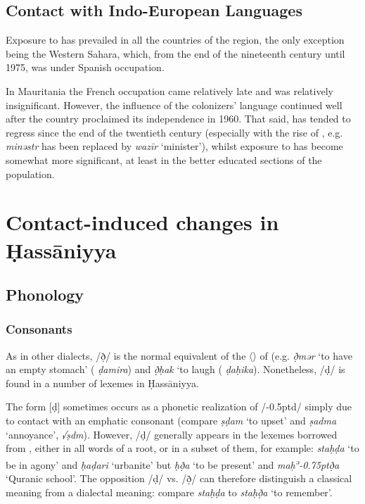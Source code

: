 \documentclass[output=paper]{langsci/langscibook}
\begin{document}
\subsection{Contact with Indo-European Languages} %

Exposure to  has prevailed in all the countries of the region, the only exception being the {Western} Sahara, which, from the end of the nineteenth century until 1975, was under Spanish occupation.

In Mauritania the French occupation came relatively late and was relatively insignificant. However, the influence of the colonizers’ language continued well after the country proclaimed its independence in 1960. That said,  has tended to regress since the end of the twentieth century (especially with the rise of  , e.g. \textit{minəstr} has been replaced by \textit{wazīr} ‘minister’), whilst exposure to  has become somewhat more significant, at least in the better educated sections of the population.

\section{Contact-induced changes in Ḥassāniyya} %

\subsection{Phonology} %

\subsubsection{Consonants} %
As in other  dialects, /ð̣/ is the normal equivalent of the 〈〉 of   (e.g. \textit{ð̣mər} ‘to have an empty stomach’ ( \textit{ḍamira}) and \textit{ð̣ḥak} ‘to laugh ( \textit{ḍaḥika}). Nonetheless, /ḍ/ is found in a number of lexemes in Ḥassāniyya. 

The form [ḍ] sometimes occurs as a phonetic realization of /\kern -0.5ptd/ simply due to contact with an {emphatic consonant} (compare \textit{ṣḍam} ‘to upset’ and \textit{ṣadma} ‘annoyance’,  \textit{√ṣdm}). However, /ḍ/ generally appears in the lexemes borrowed from  , either in all words of a {root}, or in a subset of them, for example: \textit{staḥḍa{\R}} ‘to be in agony’ and \textit{ḥaḍari} ‘urbanite’ but \textit{ḥð̣a{\R}} ‘to be present’ and \textit{maḥ\textsuperscript{ə}\kern -0.75ptð̣{\R}a} ‘Quranic school’. The opposition /ḍ/ vs. /ð̣/ can therefore distinguish a classical meaning from a dialectal meaning: compare \textit{staḥḍa{\R}} to \textit{staḥð̣a{\R}} ‘to remember’.
\end{document}
